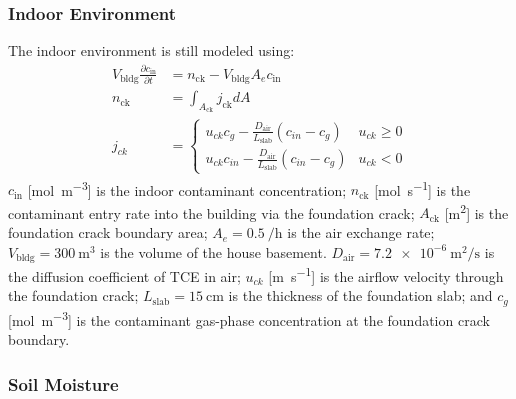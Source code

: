 \subsubsection{Indoor Environment}

The indoor environment is still modeled using:
\begin{align*}
    V_\mathrm{bldg}\frac{\partial c_\mathrm{in}}{\partial t} &= n_\mathrm{ck} - V_\mathrm{bldg} A_e c_\mathrm{in} \\
    n_\mathrm{ck} &= \int_{A_\mathrm{ck}} j_\mathrm{ck} dA \\
    j_{ck} &= \begin{cases}
      u_{ck} c_g - \frac{D_\mathrm{air}}{L_\mathrm{slab}} (c_{in} - c_g) & u_{ck} \geq 0 \\
      u_{ck} c_{in} - \frac{D_\mathrm{air}}{L_\mathrm{slab}} (c_{in} - c_g) & u_{ck} < 0
  \end{cases}
\end{align*}
$c_\mathrm{in}$ [\si{\mol\per\metre\cubed}] is the indoor contaminant concentration;
$n_\mathrm{ck}$ [\si{\mol\per\second}] is the contaminant entry rate into the building via the foundation crack;
$A_\mathrm{ck}$ [\si{\metre\squared}] is the foundation crack boundary area;
$A_e = \SI{0.5}{\per\hour}$ is the air exchange rate;
$V_\mathrm{bldg} = \SI{300}{\metre\cubed}$ is the volume of the house basement.
$D_\mathrm{air} = \SI{7.2e-6}{\metre\squared\per\second}$ is the diffusion coefficient of TCE in air;
$u_{ck}$ [\si{\metre\per\second}] is the airflow velocity through the foundation crack;
$L_\mathrm{slab} = \SI{15}{\centi\metre}$ is the thickness of the foundation slab;
and $c_g$ [\si{\mol\per\metre\cubed}] is the contaminant gas-phase concentration at the foundation crack boundary.\par

\subsubsection{Soil Moisture}

